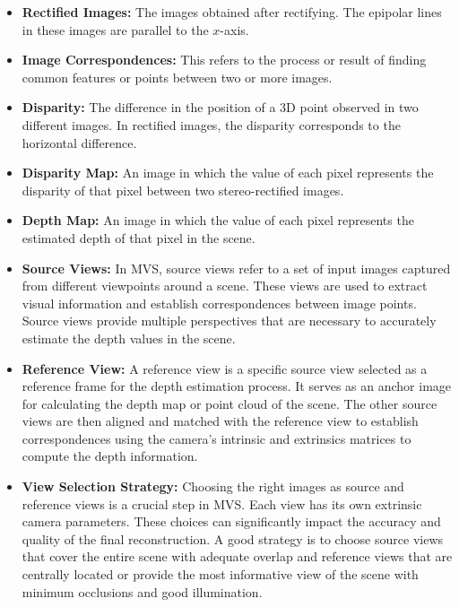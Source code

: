 \begin{itemize}
\item \textbf{Rectified Images:} The images obtained after rectifying. The epipolar lines in these images are parallel to the $x$-axis.
\item \textbf{Image Correspondences:} This refers to the process or result of finding common features or points between two or more images. 
\item \textbf{Disparity:} The difference in the position of a 3D point observed in two different images. In rectified images, the disparity corresponds to the horizontal difference.
\item \textbf{Disparity Map:} An image in which the value of each pixel represents the disparity of that pixel between two stereo-rectified images.
\item \textbf{Depth Map:} An image in which the value of each pixel represents the estimated depth of that pixel in the scene.
\item \textbf{Source Views:}
In MVS, source views refer to a set of input images captured from different viewpoints around a scene. These views are used to extract visual information and establish correspondences between image points. Source views provide multiple perspectives that are necessary to accurately estimate the depth values in the scene. 
\item \textbf{Reference View:}
A reference view is a specific source view selected as a reference frame for the depth estimation process. It serves as an anchor image for calculating the depth map or point cloud of the scene. The other source views are then aligned and matched with the reference view to establish correspondences using the camera's intrinsic and extrinsics matrices to compute the depth information.
\item \textbf{View Selection Strategy:}
Choosing the right images as source and reference views is a crucial step in MVS. Each view has its own extrinsic camera parameters. These choices can significantly impact the accuracy and quality of the final reconstruction. A good strategy is to choose source views that cover the entire scene with adequate overlap and reference views that are centrally located or provide the most informative view of the scene with minimum occlusions and good illumination. 
\end{itemize}

